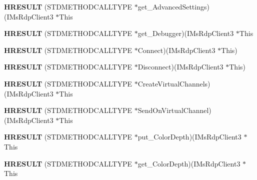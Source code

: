 \begin{DoxyCompactItemize}
{\bfseries H\+R\+E\+S\+U\+LT} (S\+T\+D\+M\+E\+T\+H\+O\+D\+C\+A\+L\+L\+T\+Y\+PE $\ast$get\+\_\+\+Advanced\+Settings)(I\+Ms\+Rdp\+Client3 $\ast$This
\item 
\mbox{\label{struct_i_ms_rdp_client3_vtbl_ae204577dec6dbda76655b58106c4f887}} 
{\bfseries H\+R\+E\+S\+U\+LT} (S\+T\+D\+M\+E\+T\+H\+O\+D\+C\+A\+L\+L\+T\+Y\+PE $\ast$get\+\_\+\+Debugger)(I\+Ms\+Rdp\+Client3 $\ast$This
\item 
\mbox{\label{struct_i_ms_rdp_client3_vtbl_a2ce26d0aa583d07cf29868d26b65e6f9}} 
{\bfseries H\+R\+E\+S\+U\+LT} (S\+T\+D\+M\+E\+T\+H\+O\+D\+C\+A\+L\+L\+T\+Y\+PE $\ast$Connect)(I\+Ms\+Rdp\+Client3 $\ast$This)
\item 
\mbox{\label{struct_i_ms_rdp_client3_vtbl_a7b8e81da7f9c9de400ec2f935d9898de}} 
{\bfseries H\+R\+E\+S\+U\+LT} (S\+T\+D\+M\+E\+T\+H\+O\+D\+C\+A\+L\+L\+T\+Y\+PE $\ast$Disconnect)(I\+Ms\+Rdp\+Client3 $\ast$This)
\item 
\mbox{\label{struct_i_ms_rdp_client3_vtbl_af1d370c69edf736f92ffacbd31f6313a}} 
{\bfseries H\+R\+E\+S\+U\+LT} (S\+T\+D\+M\+E\+T\+H\+O\+D\+C\+A\+L\+L\+T\+Y\+PE $\ast$Create\+Virtual\+Channels)(I\+Ms\+Rdp\+Client3 $\ast$This
\item 
\mbox{\label{struct_i_ms_rdp_client3_vtbl_a7727671d45e960949aa1f87d7fad1411}} 
{\bfseries H\+R\+E\+S\+U\+LT} (S\+T\+D\+M\+E\+T\+H\+O\+D\+C\+A\+L\+L\+T\+Y\+PE $\ast$Send\+On\+Virtual\+Channel)(I\+Ms\+Rdp\+Client3 $\ast$This
\item 
\mbox{\label{struct_i_ms_rdp_client3_vtbl_a4e2b64675614456218c85597b52bd667}} 
{\bfseries H\+R\+E\+S\+U\+LT} (S\+T\+D\+M\+E\+T\+H\+O\+D\+C\+A\+L\+L\+T\+Y\+PE $\ast$put\+\_\+\+Color\+Depth)(I\+Ms\+Rdp\+Client3 $\ast$This
\item 
\mbox{\label{struct_i_ms_rdp_client3_vtbl_a097bdacb221028c365cf15b2790e9c6d}} 
{\bfseries H\+R\+E\+S\+U\+LT} (S\+T\+D\+M\+E\+T\+H\+O\+D\+C\+A\+L\+L\+T\+Y\+PE $\ast$get\+\_\+\+Color\+Depth)(I\+Ms\+Rdp\+Client3 $\ast$This
\item 
\mbox{\label{struct_i_ms_rdp_client3_vtbl_a489212ffa09ca7ff0916fdb925c22004}} 

\end{DoxyCompactItemize}
